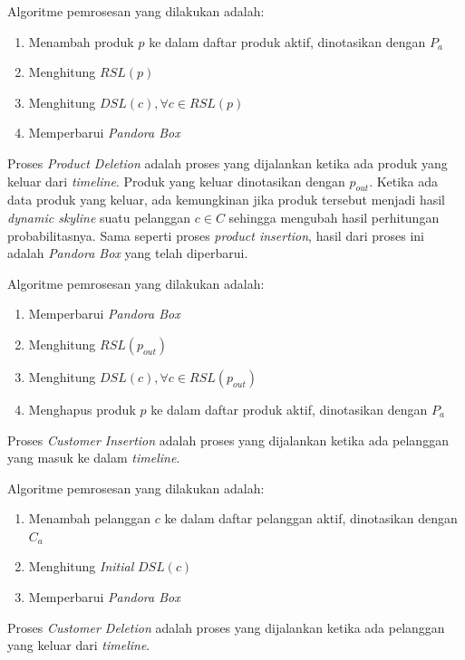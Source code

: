 Algoritme pemrosesan yang dilakukan adalah:
\begin{enumerate}
	\item Menambah produk $p$ ke dalam daftar produk aktif, dinotasikan dengan $P_a$
	\item Menghitung $RSL(p)$
	\item Menghitung $DSL(c), \forall c \in RSL(p)$ 
	\item Memperbarui \textit{Pandora Box}
\end{enumerate}


Proses \textit{Product Deletion} adalah proses yang dijalankan ketika ada produk yang keluar dari \textit{timeline}. Produk yang keluar dinotasikan dengan $p_{out}$. Ketika ada data produk yang keluar, ada kemungkinan jika produk tersebut menjadi hasil \textit{dynamic skyline} suatu pelanggan $c \in C$ sehingga mengubah hasil perhitungan probabilitasnya. Sama seperti proses \textit{product insertion}, hasil dari proses ini adalah \textit{Pandora Box} yang telah diperbarui.

Algoritme pemrosesan yang dilakukan adalah:
\begin{enumerate}
	\item Memperbarui \textit{Pandora Box}
	\item Menghitung $RSL(p_{out})$
	\item Menghitung $DSL(c), \forall c \in RSL(p_{out})$
	\item Menghapus produk $p$ ke dalam daftar produk aktif, dinotasikan dengan $P_a$
\end{enumerate}


Proses \textit{Customer Insertion} adalah proses yang dijalankan ketika ada pelanggan yang masuk ke dalam \textit{timeline}. 

Algoritme pemrosesan yang dilakukan adalah:
\begin{enumerate}
	\item Menambah pelanggan $c$ ke dalam daftar pelanggan aktif, dinotasikan dengan $C_a$
	\item Menghitung \textit{Initial} $DSL(c)$ 
	\item Memperbarui \textit{Pandora Box}
\end{enumerate}


Proses \textit{Customer Deletion} adalah proses yang dijalankan ketika ada pelanggan yang keluar dari \textit{timeline}. 

